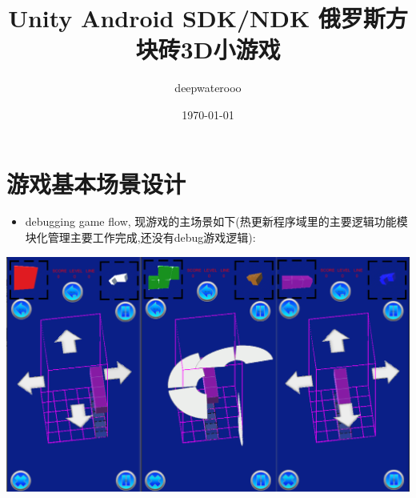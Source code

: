 \documentclass[9pt, b5paper]{article}
\author{deepwaterooo}
\date{\today}
\title{Unity Android SDK/NDK 俄罗斯方块砖3D小游戏}
\begin{document}
\maketitle
\tableofcontents


\section{游戏基本场景设计}
\label{sec-1}
\begin{itemize}
\item debugging game flow, 现游戏的主场景如下(热更新程序域里的主要逻辑功能模块化管理主要工作完成,还没有debug游戏逻辑):
\end{itemize}

\includegraphics[width=.9\linewidth]{./pic/readme_20221030_162737.png}
\end{document}
